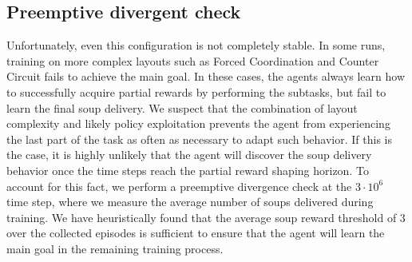 \subsection*{Preemptive divergent check}
Unfortunately, even this configuration is not completely stable.
In some runs, training on more complex layouts such as Forced Coordination and Counter Circuit fails to achieve the main goal.
In these cases, the agents always learn how to successfully acquire partial rewards by performing the subtasks, but fail to learn the final soup delivery.
We suspect that the combination of layout complexity and likely policy exploitation prevents the agent from experiencing the last part of the task as often as necessary to adapt such behavior.
If this is the case, it is highly unlikely that the agent will discover the soup delivery behavior once the time steps reach the partial reward shaping horizon.
To account for this fact, we perform a preemptive divergence check at the $3\cdot10^6$ time step, where we measure the average number of soups delivered during training.
We have heuristically found that the average soup reward threshold of $3$ over the collected episodes is sufficient to ensure that the agent will learn the main goal in the remaining training process.


